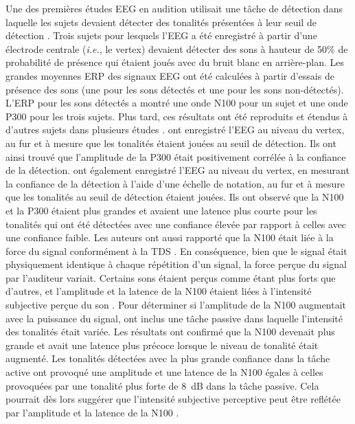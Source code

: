Une des premières études EEG en audition utilisait une tâche de détection dans laquelle les sujets devaient détecter des tonalités présentées à leur seuil de détection \citep{hillyard1971evoked}. 
Trois sujets pour lesquels l'EEG a été enregistré à partir d'une électrode centrale (\textit{i.e.}, le vertex) devaient détecter des sons à hauteur de 50\% de probabilité de présence qui étaient joués avec du bruit blanc en arrière-plan. 
Les grandes moyennes ERP des signaux EEG ont été calculées à partir d'essais de présence des sons (une pour les sons détectés et une pour les sons non-détectés). 
L'ERP pour les sons détectés a montré une onde N100 pour un sujet et une onde P300 pour les trois sujets. 
Plus tard, ces résultats ont été reproduits et étendus à d'autres sujets dans plusieurs études \citep{parasuraman1980brain, paul1972evoked, squires1973vertex}. 
\cite{paul1972evoked} ont enregistré l'EEG au niveau du vertex, au fur et à mesure que les tonalités étaient jouées au seuil de détection. 
Ils ont ainsi trouvé que l'amplitude de la P300 était positivement corrélée à la confiance de la détection. 
\cite{squires1973vertex} ont également enregistré l'EEG au niveau du vertex, en mesurant la confiance de la détection à l'aide d'une échelle de notation, au fur et à mesure que les tonalités au seuil de détection étaient jouées. 
Ils ont observé que la N100 et la P300 étaient plus grandes et avaient une latence plus courte pour les tonalités qui ont été détectées avec une confiance élevée par rapport à celles avec une confiance faible. 
Les auteurs ont aussi rapporté que la N100 était liée à la force du signal conformément à la TDS \citep{macmillan2004detection, squires1973vertex}. 
En conséquence, bien que le signal était physiquement identique à chaque répétition d'un signal, la force perçue du signal par l'auditeur variait. 
Certains sons étaient perçus comme étant plus forts que d'autres, et l'amplitude et la latence de la N100 étaient liées à l'intensité subjective perçue du son \citep{picton1977evoked, squires1973vertex}. 
Pour déterminer si l'amplitude de la N100 augmentait avec la puissance du signal, \cite{squires1973vertex} ont inclus une tâche passive dans laquelle l'intensité des tonalités était variée. 
Les résultats ont confirmé que la N100 devenait plus grande et avait une latence plus précoce lorsque le niveau de tonalité était augmenté. 
Les tonalités détectées avec la plus grande confiance dans la tâche active ont provoqué une amplitude et une latence de la N100 égales à celles provoquées par une tonalité plus forte de $8$~dB dans la tâche passive. 
Cela pourrait dès lors suggérer que l'intensité subjective perceptive peut être reflétée par l'amplitude et la latence de la N100 \citep{eklund2019electrophysiological}. 

